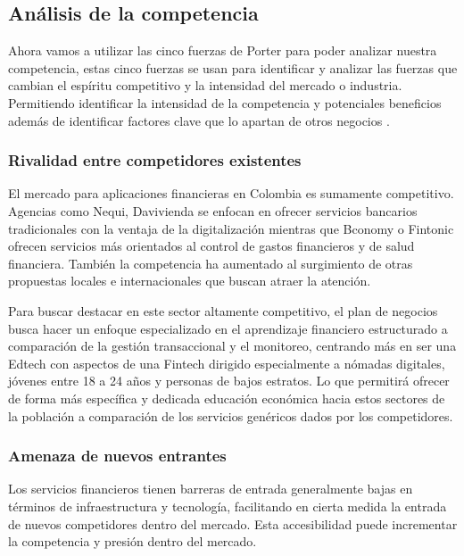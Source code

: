 {}
\subsection*{Análisis de la competencia}

Ahora vamos a utilizar las cinco fuerzas de Porter para poder analizar nuestra competencia, estas cinco fuerzas se usan para identificar y analizar las fuerzas que cambian el espíritu competitivo y la intensidad del mercado o industria. Permitiendo identificar la intensidad de la competencia y potenciales beneficios además de identificar factores clave que lo apartan de otros negocios \parencite{Investopedia02}.

{}
\subsubsection*{Rivalidad entre competidores existentes}

El mercado para aplicaciones financieras en Colombia es sumamente competitivo. Agencias como Nequi, Davivienda se enfocan en ofrecer servicios bancarios tradicionales con la ventaja de la digitalización mientras que Bconomy o Fintonic ofrecen servicios más orientados al control de gastos financieros y de salud financiera. También la competencia ha aumentado al surgimiento de otras propuestas locales e internacionales que buscan atraer la atención.

Para buscar destacar en este sector altamente competitivo, el plan de negocios busca hacer un enfoque especializado en el aprendizaje financiero estructurado a comparación de la gestión transaccional y el monitoreo, centrando más en ser una Edtech con aspectos de una Fintech dirigido especialmente a nómadas digitales, jóvenes entre 18 a 24 años y personas de bajos estratos. Lo que permitirá ofrecer de forma más específica y dedicada educación económica hacia estos sectores de la población a comparación de los servicios genéricos dados por los competidores.

{}
\subsubsection*{Amenaza de nuevos entrantes}

Los servicios financieros tienen barreras de entrada generalmente bajas en términos de infraestructura y tecnología, facilitando en cierta medida la entrada de nuevos competidores dentro del mercado. Esta accesibilidad puede incrementar la competencia y presión dentro del mercado.

